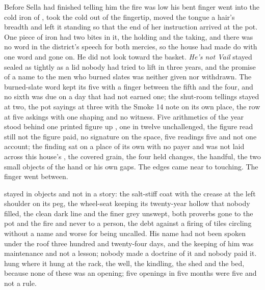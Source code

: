 Before Sella had finished telling him the fire was low his bent finger went into the cold iron of , took the cold out of the fingertip, moved the tongue a hair's breadth and left it standing so that the end of her instruction arrived at the pot. One piece of iron had two bites in it, the holding and the taking, and there was no word in the district's speech for both mercies, so the house had made do with one word and gone on. He did not look toward the basket. \emph{He's not Vail} stayed sealed as tightly as a lid nobody had tried to lift in three years, and the promise of a name to the men who burned slates was neither given nor withdrawn. The burned-slate word kept its five with a finger between the fifth and the four, and no sixth was due on a day that had not earned one; the shut-room tellings stayed at two, the pot sayings at three with the Smoke 14 note on its own place, the row at five askings with one shaping and no witness. Five arithmetics of the year stood behind one printed figure up , one in twelve unchallenged, the figure read still not the figure paid, no signature on the space, five readings five and not one account; the finding sat on a place of its own with no payer and was not laid across this house's , the covered grain, the four held changes, the handful, the two small objects of the hand or his own gaps. The edges came near to touching. The finger went between.

 stayed in objects and not in a story: the salt-stiff coat with the crease at the left shoulder on its peg, the wheel-seat keeping its twenty-year hollow that nobody filled, the clean dark line and the finer grey unswept, both proverbs gone to the pot and the fire and never to a person, the debt against a firing of tiles circling without a name and worse for being uncalled. His name had not been spoken under the roof three hundred and twenty-four days, and the keeping of him was maintenance and not a lesson; nobody made a doctrine of it and nobody paid it.  hung where it hung at the rack, the well, the kindling, the shed and the bed, because none of these was an opening; five openings in five months were five and not a rule.

\scenebreak

